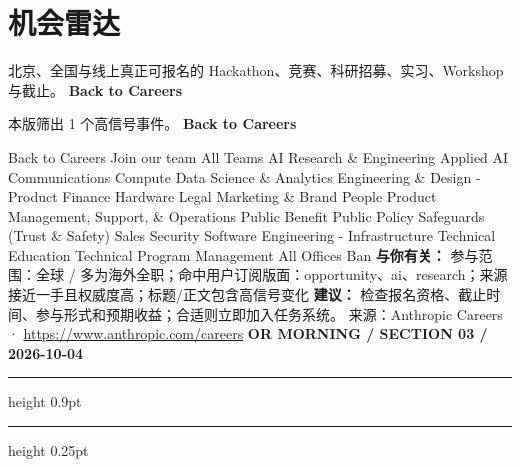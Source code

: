 \documentclass[10.5pt]{ctexart}
\begin{document}
\section*{机会雷达}
{\color{ormuted} 北京、全国与线上真正可报名的 Hackathon、竞赛、科研招募、实习、Workshop 与截止。}
\vspace{2mm}
{\LARGE\bfseries Back to Careers}\par
\vspace{1mm}
{\color{ormuted} 本版筛出 1 个高信号事件。}
\vspace{3mm}
{\Large\bfseries Back to Careers}\par
Back to Careers Join our team All Teams AI Research \& Engineering Applied AI Communications Compute Data Science \& Analytics Engineering \& Design - Product Finance Hardware Legal Marketing \& Brand People Product Management, Support, \& Operations Public Benefit Public Policy Safeguards (Trust \& Safety) Sales Security Software Engineering - Infrastructure Technical Education Technical Program Management All Offices Ban
\textbf{与你有关：} 参与范围：全球 / 多为海外全职；命中用户订阅版面：opportunity、ai、research；来源接近一手且权威度高；标题/正文包含高信号变化
\textbf{建议：} 检查报名资格、截止时间、参与形式和预期收益；合适则立即加入任务系统。
{\footnotesize\color{ormuted} 来源：Anthropic Careers · \url{https://www.anthropic.com/careers}}
\newpage
{\small\bfseries OR MORNING / SECTION 03 / 2026-10-04}
\vspace{2mm}
\hrule height 0.9pt
\vspace{1.5mm}
\hrule height 0.25pt
\vspace{4mm}
\end{document}
